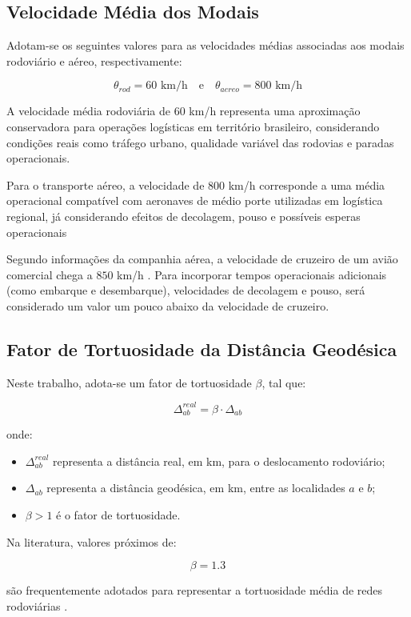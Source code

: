 \subsection{Velocidade Média dos Modais}

Adotam-se os seguintes valores para as velocidades médias associadas aos modais rodoviário e aéreo, respectivamente:

\[
\theta_{rod} = 60 \text{ km/h} \quad \text{e} \quad \theta_{aereo} = 800 \text{ km/h}
\]

A velocidade média rodoviária de $60$ km/h representa uma aproximação conservadora para operações logísticas em território brasileiro, considerando condições reais como tráfego urbano, qualidade variável das rodovias e paradas operacionais.

Para o transporte aéreo, a velocidade de $800$ km/h corresponde a uma média operacional compatível com aeronaves de médio porte utilizadas em logística regional, já considerando efeitos de decolagem, pouso e possíveis esperas operacionais \cite{latam:2026}

Segundo informações da companhia aérea, a velocidade de cruzeiro de um avião comercial chega a $850$ km/h \cite{latam:2026}. Para incorporar tempos operacionais adicionais (como embarque e desembarque), velocidades de decolagem e pouso, será considerado um valor um pouco abaixo da velocidade de cruzeiro.

\subsection{Fator de Tortuosidade da Distância Geodésica}

Neste trabalho, adota-se um fator de tortuosidade $\beta$, tal que:

\[
\Delta_{ab}^{real} = \beta \cdot \Delta_{ab}
\]

onde:
\begin{itemize}
    \item $\Delta_{ab}^{real}$ representa a distância real, em km, para o deslocamento rodoviário;
    \item $\Delta_{ab}$ representa a distância geodésica, em km, entre as localidades $a$ e $b$;
    \item $\beta > 1$ é o fator de tortuosidade.
\end{itemize}

Na literatura, valores próximos de:

\[
\beta = 1.3
\]

são frequentemente adotados para representar a tortuosidade média de redes rodoviárias \cite{kweon2019}.


